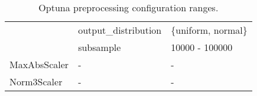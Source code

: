 \begin{table*}
\begin{tabular}{@{}l>{\ttfamily}lp{}@{}}
                                     & output\_distribution              & \{uniform, normal\}                      \\ \cmidrule{2-3}
                                     & subsample                         & 10000 - 100000                           \\ \midrule
MaxAbsScaler                         & -                                 & -                                        \\ \midrule
Norm3Scaler                          & -                                 & -                                        \\ \midrule
\end{tabular}
\label{tab:optuna_preprocessing_configurations}
\caption{Optuna preprocessing configuration ranges.}
\end{table*}


